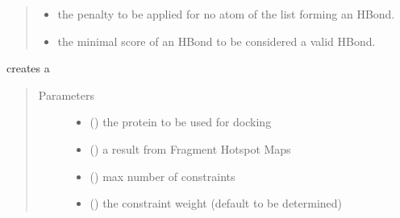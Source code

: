 \documentclass[letterpaper,10pt,english]{sphinxmanual}
\begin{document}
\begin{fulllineitems}
\begin{fulllineitems}
\begin{quote}
\begin{description}
\begin{itemize}
\item {} 
 \textendash{} the penalty to be applied for no atom of the list forming an HBond.

\item {} 
 \textendash{} the minimal score of an HBond to be considered a valid HBond.

\end{itemize}

\end{description}\end{quote}

\begin{fulllineitems}
\label{\detokenize{hs_docking_api:hotspots.hs_docking.DockerSettings.HotspotHBondConstraint.create}}
creates a 
\begin{quote}\begin{description}
\item[{Parameters}] \leavevmode\begin{itemize}
\item {} 
 () \textendash{} the protein to be used for docking

\item {} 
 () \textendash{} a result from Fragment Hotspot Maps

\item {} 
 () \textendash{} max number of constraints

\item {} 
 () \textendash{} the constraint weight (default to be determined)


\end{itemize}
\end{description}
\end{quote}
\end{fulllineitems}
\end{fulllineitems}
\end{fulllineitems}
\end{document}
